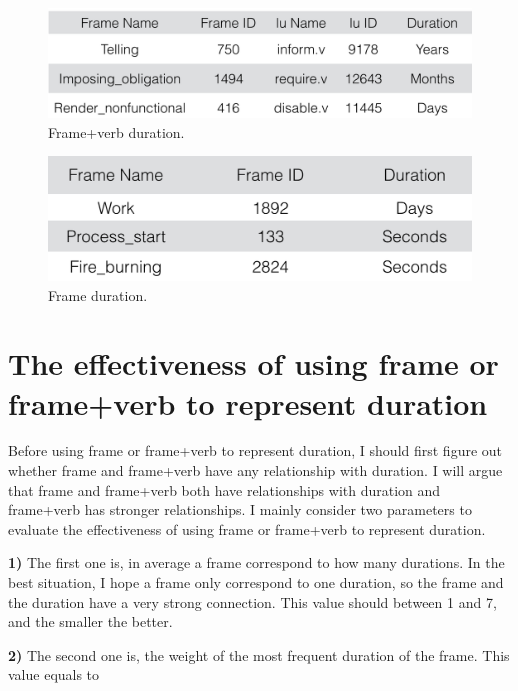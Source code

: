 \documentclass[11pt,a4paper]{article}
\begin{document}
\begin{figure}[H] 
\begin{center} 
\centerline{\includegraphics[width=\columnwidth]{figs/fig3.png}}
\caption{Frame+verb duration.}
\label{third_fig}
\end{center}
\vskip -0.3in
\end{figure}


\begin{figure}[H] 
\begin{center} 
\centerline{\includegraphics[width=\columnwidth]{figs/fig4.png}}
\caption{Frame duration.}
\label{fourth_fig}
\end{center}
\vskip -0.3in
\end{figure}


\section{The effectiveness of using frame or frame+verb to represent duration}

Before using frame or frame+verb to represent duration, I should first figure out whether frame and frame+verb have any relationship with duration. I will argue that frame and frame+verb both have relationships with duration and frame+verb has stronger relationships.
I mainly consider two parameters to evaluate the effectiveness of using frame or frame+verb to represent duration.

\textbf{1)} The first one is, in average a frame correspond to how many durations. In the best situation, I hope a frame only correspond to one duration, so the frame and the duration have a very strong connection. This value should between 1 and 7, and the smaller the better.

\textbf{2)} The second one is, the weight of the most frequent duration of the frame. This value equals to 
\end{document}
